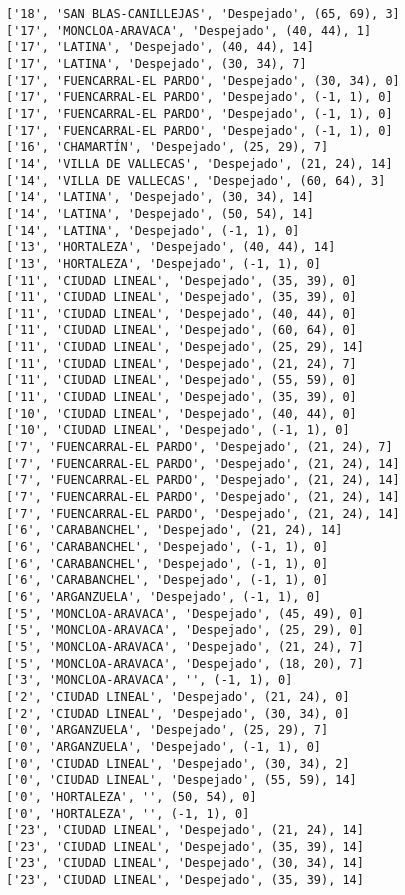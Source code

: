 \documentclass[11pt]{article}
\begin{document}
\begin{Verbatim}[commandchars=\\\{\}]
['18', 'SAN BLAS-CANILLEJAS', 'Despejado', (65, 69), 3]
['17', 'MONCLOA-ARAVACA', 'Despejado', (40, 44), 1]
['17', 'LATINA', 'Despejado', (40, 44), 14]
['17', 'LATINA', 'Despejado', (30, 34), 7]
['17', 'FUENCARRAL-EL PARDO', 'Despejado', (30, 34), 0]
['17', 'FUENCARRAL-EL PARDO', 'Despejado', (-1, 1), 0]
['17', 'FUENCARRAL-EL PARDO', 'Despejado', (-1, 1), 0]
['17', 'FUENCARRAL-EL PARDO', 'Despejado', (-1, 1), 0]
['16', 'CHAMARTÍN', 'Despejado', (25, 29), 7]
['14', 'VILLA DE VALLECAS', 'Despejado', (21, 24), 14]
['14', 'VILLA DE VALLECAS', 'Despejado', (60, 64), 3]
['14', 'LATINA', 'Despejado', (30, 34), 14]
['14', 'LATINA', 'Despejado', (50, 54), 14]
['14', 'LATINA', 'Despejado', (-1, 1), 0]
['13', 'HORTALEZA', 'Despejado', (40, 44), 14]
['13', 'HORTALEZA', 'Despejado', (-1, 1), 0]
['11', 'CIUDAD LINEAL', 'Despejado', (35, 39), 0]
['11', 'CIUDAD LINEAL', 'Despejado', (35, 39), 0]
['11', 'CIUDAD LINEAL', 'Despejado', (40, 44), 0]
['11', 'CIUDAD LINEAL', 'Despejado', (60, 64), 0]
['11', 'CIUDAD LINEAL', 'Despejado', (25, 29), 14]
['11', 'CIUDAD LINEAL', 'Despejado', (21, 24), 7]
['11', 'CIUDAD LINEAL', 'Despejado', (55, 59), 0]
['11', 'CIUDAD LINEAL', 'Despejado', (35, 39), 0]
['10', 'CIUDAD LINEAL', 'Despejado', (40, 44), 0]
['10', 'CIUDAD LINEAL', 'Despejado', (-1, 1), 0]
['7', 'FUENCARRAL-EL PARDO', 'Despejado', (21, 24), 7]
['7', 'FUENCARRAL-EL PARDO', 'Despejado', (21, 24), 14]
['7', 'FUENCARRAL-EL PARDO', 'Despejado', (21, 24), 14]
['7', 'FUENCARRAL-EL PARDO', 'Despejado', (21, 24), 14]
['7', 'FUENCARRAL-EL PARDO', 'Despejado', (21, 24), 14]
['6', 'CARABANCHEL', 'Despejado', (21, 24), 14]
['6', 'CARABANCHEL', 'Despejado', (-1, 1), 0]
['6', 'CARABANCHEL', 'Despejado', (-1, 1), 0]
['6', 'CARABANCHEL', 'Despejado', (-1, 1), 0]
['6', 'ARGANZUELA', 'Despejado', (-1, 1), 0]
['5', 'MONCLOA-ARAVACA', 'Despejado', (45, 49), 0]
['5', 'MONCLOA-ARAVACA', 'Despejado', (25, 29), 0]
['5', 'MONCLOA-ARAVACA', 'Despejado', (21, 24), 7]
['5', 'MONCLOA-ARAVACA', 'Despejado', (18, 20), 7]
['3', 'MONCLOA-ARAVACA', '', (-1, 1), 0]
['2', 'CIUDAD LINEAL', 'Despejado', (21, 24), 0]
['2', 'CIUDAD LINEAL', 'Despejado', (30, 34), 0]
['0', 'ARGANZUELA', 'Despejado', (25, 29), 7]
['0', 'ARGANZUELA', 'Despejado', (-1, 1), 0]
['0', 'CIUDAD LINEAL', 'Despejado', (30, 34), 2]
['0', 'CIUDAD LINEAL', 'Despejado', (55, 59), 14]
['0', 'HORTALEZA', '', (50, 54), 0]
['0', 'HORTALEZA', '', (-1, 1), 0]
['23', 'CIUDAD LINEAL', 'Despejado', (21, 24), 14]
['23', 'CIUDAD LINEAL', 'Despejado', (35, 39), 14]
['23', 'CIUDAD LINEAL', 'Despejado', (30, 34), 14]
['23', 'CIUDAD LINEAL', 'Despejado', (35, 39), 14]

\end{Verbatim}
\end{document}
